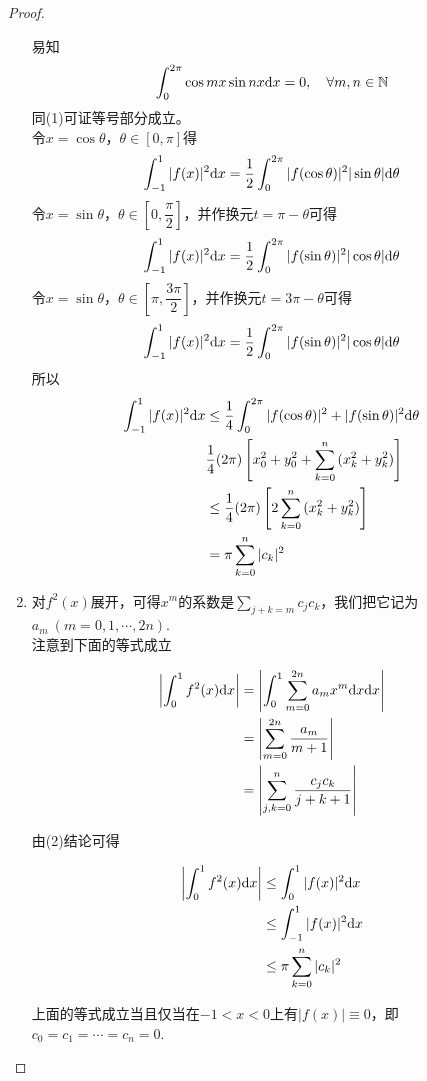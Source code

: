 \begin{proof}
\begin{enumerate}
    易知
    \[\int_{0}^{2\pi}{\cos{mx}\sin{nx}} \mathrm{d} x = 0, \quad \forall m,n \in \mathbb{N}\]
    同\textup{(1)}可证等号部分成立。 \\
    令$x = \cos{\theta}$，$\theta \in [0, \pi]$得
    \[\int_{-1}^{1}{|f(x)|^2}\mathrm{d} x = \dfrac{1}{2} \int_{0}^{2\pi}{|f(\cos{\theta})|^2|\sin{\theta}|}\mathrm{d} \theta\]
    令$x = \sin{\theta}$，$\theta \in \left[ 0, \dfrac{\pi}{2} \right]$，并作换元$t = \pi -\theta$可得
    \[\int_{-1}^{1}{|f(x)|^2}\mathrm{d} x = \dfrac{1}{2} \int_{0}^{2\pi}{|f(\sin{\theta})|^2|\cos{\theta}|}\mathrm{d} \theta\]
    令$x = \sin{\theta}$，$\theta \in \left[ \pi, \dfrac{3\pi}{2} \right]$，并作换元$t = 3\pi -\theta$可得
    \[\int_{-1}^{1}{|f(x)|^2}\mathrm{d} x = \dfrac{1}{2} \int_{0}^{2\pi}{|f(\sin{\theta})|^2|\cos{\theta}|}\mathrm{d} \theta\]
    所以
    \begin{align*}
        \int_{-1}^{1}{|f(x)|^2}\mathrm{d} x & \leq \dfrac{1}{4} \int_{0}^{2\pi}{|f(\cos{\theta})|^2 + |f(\sin{\theta})|^2} \mathrm{d} \theta \\
        & \dfrac{1}{4} (2\pi) \left[ x_0^2 + y_0^2 + \sum\limits_{k = 0}^{n}{(x_k^2 + y_k^2)} \right] \\
        & \leq \dfrac{1}{4} (2\pi) \left[ 2\sum\limits_{k = 0}^{n}{(x_k^2 + y_k^2)} \right] \\
        & = \pi \sum\limits_{k = 0}^{n}{|c_k|^2}
    \end{align*}

    \item 
        对$f^2(x)$展开，可得$x^m$的系数是$\sum\limits_{j + k = m}{c_j c_k}$，我们把它记为$a_m \ (m = 0, 1, \cdots, 2n)$. \\
        注意到下面的等式成立
        
        \begin{align*}
            \left| \int_{0}^{1}{f^2(x)}\mathrm{d} x \right| & =  \left| \int_{0}^{1}{\sum\limits_{m = 0}^{2n}{a_m x^m}}\mathrm{d} x \mathrm{d} x \right| \\
            & =  \left| \sum\limits_{m = 0}^{2n}{\dfrac{a_m}{m + 1}} \right| \\
            & =  \left| \sum\limits_{j, k = 0}^{n}{\dfrac{c_j c_k}{j + k + 1}} \right|
        \end{align*}

        由\textup{(2)}结论可得

        \begin{align*}
            \left| \int_{0}^{1}{f^2(x)}\mathrm{d} x \right| & \leq \int_{0}^{1}{|f(x)|^2}\mathrm{d} x \\
            & \leq \int_{-1}^{1}{|f(x)|^2}\mathrm{d} x \\
            & \leq \pi \sum\limits_{k = 0}^{n}{|c_k|^2}
        \end{align*}

        上面的等式成立当且仅当在$-1 < x < 0$上有$|f(x)| \equiv 0$，即$c_0 = c_1 = \cdots = c_n = 0$. 

    \end{enumerate}

    
\end{proof}


